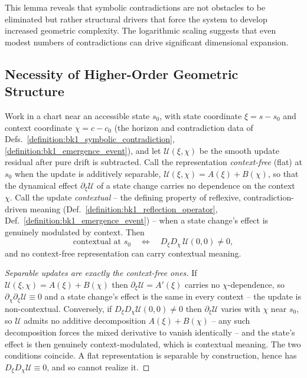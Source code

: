 This lemma reveals that symbolic contradictions are not obstacles to be eliminated but rather structural drivers that force the system to develop increased geometric complexity. The logarithmic scaling suggests that even modest numbers of contradictions can drive significant dimensional expansion.

\subsection{Necessity of Higher-Order Geometric Structure}
\label{subsec:bk1_necessity_higher_order_structure}

\begin{lemma}
\label{lemma:bk1_contextual_nonseparability}
Work in a chart near an accessible state $s_0$, with state coordinate $\xi = s-s_0$ and
context coordinate $\chi = c-c_0$ (the horizon and contradiction data of
Defs.~\ref{definition:bk1_symbolic_contradiction}, \ref{definition:bk1_emergence_event}),
and let $\mathcal{U}(\xi,\chi)$ be the smooth update residual after pure drift is
subtracted. Call the representation \emph{context-free} (flat) at $s_0$ when the update is
additively separable, $\mathcal{U}(\xi,\chi)=A(\xi)+B(\chi)$, so that the dynamical effect
$\partial_\xi\mathcal{U}$ of a state change carries no dependence on the context $\chi$.
Call the update \emph{contextual} -- the defining property of reflexive,
contradiction-driven meaning (Def.~\ref{definition:bk1_reflection_operator},
Def.~\ref{definition:bk1_emergence_event}) -- when a state change's effect is genuinely
modulated by context. Then
\[
\text{contextual at } s_0 \quad\Longleftrightarrow\quad D_\xi D_\chi\,\mathcal{U}(0,0)\neq 0,
\]
and no context-free representation can carry contextual meaning.
\end{lemma}

\begin{proof}[Separable updates are exactly the context-free ones]
\label{proof:bk1_contextual_nonseparability}
\leavevmode
If $\mathcal{U}(\xi,\chi)=A(\xi)+B(\chi)$ then $\partial_\xi\mathcal{U}=A'(\xi)$ carries no
$\chi$-dependence, so $\partial_\chi\partial_\xi\mathcal{U}\equiv 0$ and a state change's
effect is the same in every context -- the update is non-contextual. Conversely, if
$D_\xi D_\chi\mathcal{U}(0,0)\neq 0$ then $\partial_\xi\mathcal{U}$ varies with $\chi$ near
$s_0$, so $\mathcal{U}$ admits no additive decomposition $A(\xi)+B(\chi)$ -- any such
decomposition forces the mixed derivative to vanish identically -- and the state's effect
is then genuinely context-modulated, which is contextual meaning. The two conditions
coincide. A flat representation is separable by construction, hence has
$D_\xi D_\chi\mathcal{U}\equiv 0$, and so cannot realize it.
\end{proof}

